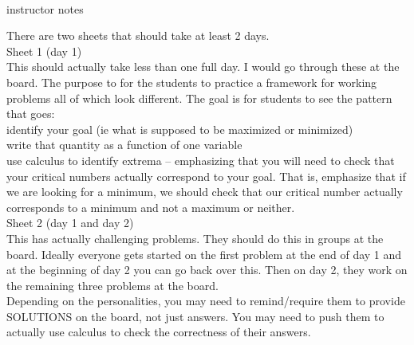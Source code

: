 \documentclass[11pt,fleqn]{article}
\begin{document}
\vspace*{-0.7in}

\begin{center}
  \Large{}\\
  instructor notes
\end{center}

There are two sheets that should take at least 2 days.\\

Sheet 1 (day 1) \\

This should actually take less than one full day. I would go through these at the board. The purpose to for the students to practice a framework for working problems all of which look different. The goal is for students to see the pattern that goes:\\

identify your goal (ie what is supposed to be maximized or minimized)\\
write that quantity as a function of one variable\\
use calculus to identify extrema -- emphasizing that you will need to check that your critical numbers actually correspond to your goal. That is, emphasize that if we are looking for a minimum, we should check that our critical number actually corresponds to a minimum and not a maximum or neither.\\

Sheet 2 (day 1 and day 2)\\

This has actually challenging problems. They should do this in groups at the board. Ideally everyone gets started on the first problem at the end of day 1 and at the beginning of day 2 you can go back over this. Then on day 2, they work on the remaining three problems at the board. \\

Depending on the personalities, you may need to remind/require them to provide SOLUTIONS on the board, not just answers. You may need to push them to actually use calculus to check the correctness of their answers.
\end{document}
